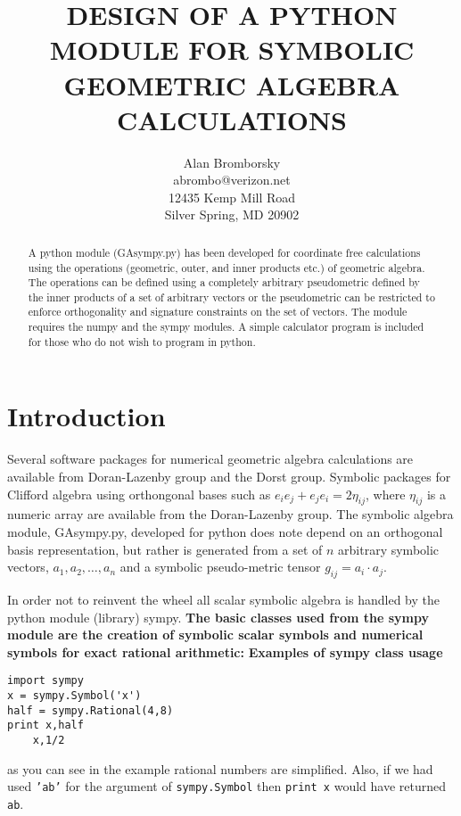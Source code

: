 \documentclass{article}
\begin{document}
\title{{\bf DESIGN OF A PYTHON MODULE FOR SYMBOLIC GEOMETRIC ALGEBRA CALCULATIONS}}

\author{Alan Bromborsky\\
abrombo@verizon.net\\
12435 Kemp Mill Road\\
Silver Spring, MD 20902}
\maketitle

\begin{abstract}
A python module (GAsympy.py) has been developed for coordinate free calculations
using the operations (geometric, outer, and inner products etc.) of geometric
algebra.  The operations can be defined using a completely arbitrary pseudometric
defined by the inner products of a set of arbitrary vectors or the pseudometric 
can be restricted to enforce orthogonality and signature constraints on the set
of vectors.  The module requires the numpy and the sympy modules.  A simple 
calculator program is included for those who do not wish to program in python.
\end{abstract}

\section{Introduction}
Several software packages for numerical geometric algebra calculations are available from Doran-Lazenby
group and the Dorst group. Symbolic packages for Clifford algebra using orthongonal bases such as
$e_{i}e_{j}+e_{j}e_{i} = 2\eta_{ij}$, where $\eta_{ij}$ is a numeric array are available from the 
Doran-Lazenby group. The symbolic algebra module, GAsympy.py, developed for python does note depend on
an orthogonal basis representation, but rather is generated from a set of $n$ arbitrary symbolic vectors, 
$a_{1},a_{2},\dots,a_{n}$ and a symbolic pseudo-metric tensor $g_{ij} = a_{i}\cdot a_{j}$.

In order not to reinvent the wheel all scalar symbolic algebra is handled by the python module (library) 
sympy. {\bf The basic classes used from the sympy module 
are the creation of symbolic scalar symbols and numerical symbols for exact rational arithmetic:}
\newpage
{\bf Examples of sympy class usage}

\begin{verbatim}
import sympy
x = sympy.Symbol('x')
half = sympy.Rational(4,8)
print x,half
	x,1/2
\end{verbatim}
as you can see in the example rational numbers are simplified. Also, if we had used {\tt 'ab'} for the 
argument of {\tt sympy.Symbol} then {\tt print x} would have returned {\tt ab}.
\end{document}
